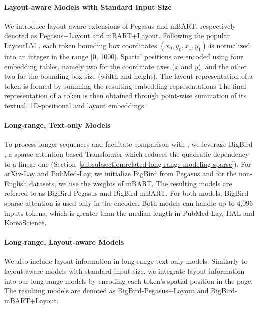 \paragraph{Layout-aware Models with Standard Input Size}

We introduce layout-aware extensions of Pegasus and mBART, respectively denoted as Pegasus+Layout and mBART+Layout. Following the popular LayoutLM \citep{xu2020layoutlm}, each token bounding box coordinates $(x_0, y_0, x_1, y_1)$ is normalized into an integer in the range [0, 1000]. Spatial positions are encoded using four embedding tables, namely two for the coordinate axes ($x$ and $y$), and the other two for the bounding box size (width and height). The layout representation of a token is formed by summing the resulting embedding representations
The final representation of a token is then obtained through point-wise summation of its textual, 1D-positional and layout embeddings.

\paragraph{Long-range, Text-only Models}

To process longer sequences and facilitate comparison with \citet{zaheer2020big}, we leverage BigBird \citep{zaheer2020big}, a sparse-attention based Transformer which reduces the quadratic dependency to a linear one (Section~\ref{subsubsection:related-long-range-modeling-sparse}). For arXiv-Lay and PubMed-Lay, we initialize BigBird from Pegasus \citep{zaheer2020big} and for the non-English datasets, we use the weights of mBART. The resulting models are referred to as BigBird-Pegasus and BigBird-mBART. For both models, BigBird sparse attention is used only in the encoder. Both models can handle up to 4,096 inputs tokens, which is greater than the median length in PubMed-Lay, HAL and KoreaScience. 


\paragraph{Long-range, Layout-aware Models}

We also include layout information in long-range text-only models. Similarly to layout-aware models with standard input size, we integrate layout information into our long-range models by encoding each token's spatial position in the page. The resulting models are denoted as BigBird-Pegasus+Layout and BigBird-mBART+Layout.



